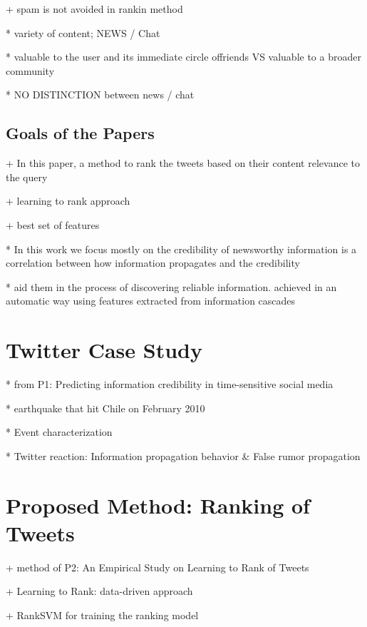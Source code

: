\documentclass{proseminar}
\begin{document}
+ spam is not avoided in rankin method

* variety of content; NEWS / Chat

* valuable to the user and its immediate circle offriends VS  valuable to a broader community

* NO DISTINCTION between news / chat


\subsection*{Goals of the Papers}
+ In this paper,  a method to rank the tweets  based on their content relevance to the query

+  learning to rank approach

+  best set of features

* In this work we focus mostly on the credibility of newsworthy information is a correlation between how information propagates and the credibility 

* aid them in the process of discovering reliable information.  achieved in an automatic way using features extracted from information cascades




\section{Twitter Case Study}
* from P1: Predicting information credibility in time-sensitive social media

* earthquake that hit Chile on February 2010

*  Event characterization

*  Twitter reaction: Information propagation behavior \& False rumor propagation



\section{Proposed Method: Ranking of \\Tweets}
+ method of P2: An Empirical Study on Learning to Rank of Tweets

+ Learning to Rank: data-driven approach

+ RankSVM for training the ranking model
\end{document}
